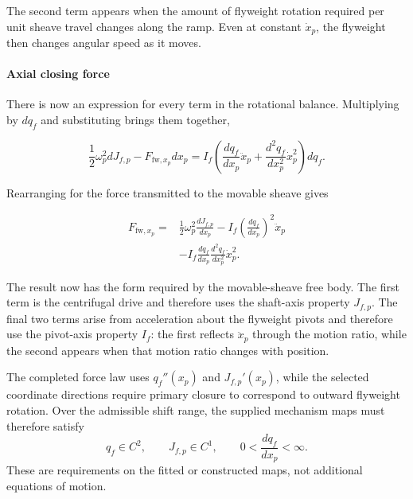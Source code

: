 \documentclass[11pt]{report}
\numberwithin{equation}{section}
\begin{document}
The second term appears when the amount of flyweight rotation required per
unit sheave travel changes along the ramp. Even at constant \(\dot x_p\), the
flyweight then changes angular speed as it moves.

\paragraph{Axial closing force}

There is now an expression for every term in the rotational balance.
Multiplying  by \(dq_f\) and
substituting
 brings them together,

\begin{equation}
    \frac{1}{2}\omega_p^2dJ_{f,p}
    -
    F_{\mathrm{fw},x_p}dx_p
    =
    I_f
    \left(
        \frac{dq_f}{dx_p}\ddot x_p
        +
        \frac{d^2q_f}{dx_p^2}\dot x_p^2
    \right)
    dq_f.
    \label{eq:primary_flyweight_moment_balance_axial}
\end{equation}

Rearranging for the force transmitted to the movable sheave gives

\begin{equation}
\boxed{
\begin{aligned}
    F_{\mathrm{fw},x_p}
    ={}&
    \frac{1}{2}\omega_p^2\frac{dJ_{f,p}}{dx_p}
    -
    I_f
    \left(\frac{dq_f}{dx_p}\right)^2
    \ddot x_p
    \\
    &-
    I_f
    \frac{dq_f}{dx_p}
    \frac{d^2q_f}{dx_p^2}
    \dot x_p^2.
\end{aligned}
}
    \label{eq:primary_flyweight_axial_force}
\end{equation}

The result now has the form required by the movable-sheave free body. The first
term is the centrifugal drive and therefore uses the shaft-axis property
\(J_{f,p}\). The final two terms arise from acceleration about the flyweight
pivots and therefore use the pivot-axis property \(I_f\): the first reflects
\(\ddot x_p\) through the motion ratio, while the second appears when that
motion ratio changes with position.

\begin{remarkbox}
The completed force law uses \(q_f''(x_p)\) and \(J_{f,p}'(x_p)\), while the
selected coordinate directions require primary closure to correspond to
outward flyweight rotation. Over the admissible shift range, the supplied
mechanism maps must therefore satisfy
\[
    q_f\in C^2,
    \qquad
    J_{f,p}\in C^1,
    \qquad
    0<
    \frac{dq_f}{dx_p}
    <\infty.
\]
These are requirements on the fitted or constructed maps, not additional
equations of motion.
\end{remarkbox}
\end{document}
